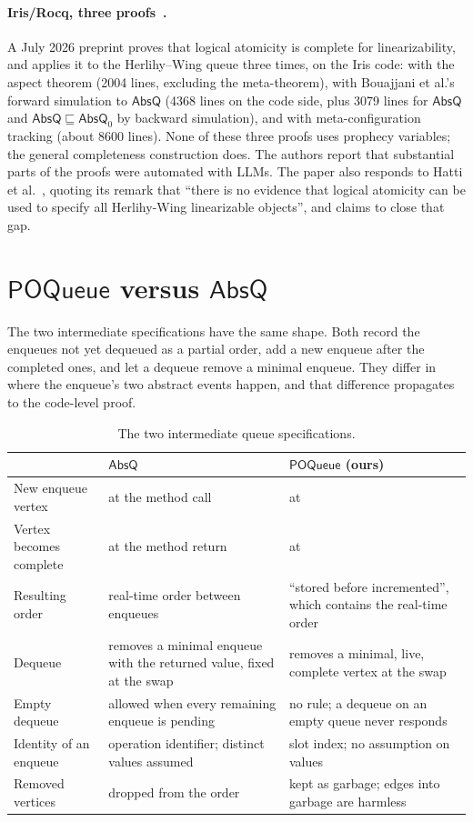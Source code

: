\documentclass[11pt]{article}
\newcommand{\code}[1]{\texttt{\detokenize{#1}}}
\newcommand{\POQueue}{\mathsf{POQueue}}
\newcommand{\AbsQ}{\mathsf{AbsQ}}
\newcommand{\AbsQz}{\mathsf{AbsQ}_0}
\begin{document}
\paragraph{Iris/Rocq, three proofs~\cite{ZGT26}.}
A July 2026 preprint proves that logical atomicity is complete for
linearizability, and applies it to the Herlihy--Wing queue three times, on
the Iris code: with the aspect theorem (2004 lines, excluding the
meta-theorem), with Bouajjani et al.'s forward simulation to $\AbsQ$ (4368
lines on the code side, plus 3079 lines for $\AbsQ$ and $\AbsQ
\sqsubseteq \AbsQz$ by backward simulation), and with meta-configuration
tracking (about 8600 lines).  None of these three proofs uses prophecy
variables; the general completeness construction does.  The authors report
that substantial parts of the proofs were automated with LLMs.  The paper
also responds to Hatti et al.~\cite{HOWFS26}, quoting its remark that
``there is no evidence that logical atomicity can be used to specify all
Herlihy-Wing linearizable objects'', and claims to close that gap.

\section{$\POQueue$ versus $\AbsQ$}
\label{sec:absq}

The two intermediate specifications have the same shape.  Both record the
enqueues not yet dequeued as a partial order, add a new enqueue after the
completed ones, and let a dequeue remove a minimal enqueue.  They differ in
where the enqueue's two abstract events happen, and that difference
propagates to the code-level proof.

\begin{table}[ht]
\centering\small
\renewcommand{\arraystretch}{1.25}
\begin{tabularx}{\textwidth}{@{}>{\raggedright\arraybackslash}p{3.4cm}
  >{\raggedright\arraybackslash}X
  >{\raggedright\arraybackslash}X@{}}
\toprule
& $\AbsQ$~\cite{BEEM17} & $\POQueue$ (ours) \\
\midrule
New enqueue vertex & at the method call & at \code{inc} \\
Vertex becomes complete & at the method return & at \code{store} \\
Resulting order & real-time order between enqueues & ``stored before
  incremented'', which contains the real-time order \\
Dequeue & removes a minimal enqueue with the returned value, fixed at the
  swap & removes a minimal, live, complete vertex at the swap \\
Empty dequeue & allowed when every remaining enqueue is pending & no rule;
  a dequeue on an empty queue never responds \\
Identity of an enqueue & operation identifier; distinct values assumed &
  slot index; no assumption on values \\
Removed vertices & dropped from the order & kept as garbage; edges into
  garbage are harmless \\
\bottomrule
\end{tabularx}
\caption{The two intermediate queue specifications.}
\label{tab:absq}
\end{table}
\end{document}
